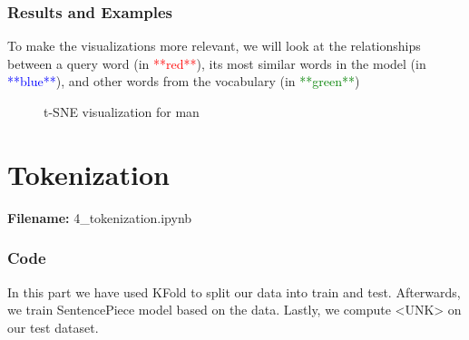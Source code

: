 \documentclass[12pt, a4paper]{article}
\begin{document}
\section*{Results and Examples}
To make the visualizations more relevant, we will look at the relationships between a query word (in \textcolor{red}{**red**}), its most similar words in the model (in \textcolor{blue}{**blue**}), and other words from the vocabulary (in \textcolor{green}{**green**})

\begin{figure}[H]
	\caption{t-SNE visualization for man}
	\label{word2vec_depression_man}
\end{figure}

\newpage
\part{Tokenization}
\large{\textbf{Filename:} 4\_tokenization.ipynb}

\section*{Code}
In this part we have used KFold to split our data into train and test. Afterwards, we train SentencePiece model based on the data. Lastly, we compute <UNK> on our test dataset. 
\end{document}

